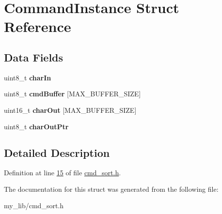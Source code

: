 \hypertarget{struct_command_instance}{\section{Command\-Instance Struct Reference}
\label{struct_command_instance}
}
\subsection*{Data Fields}
\begin{DoxyCompactItemize}
\item 
\hypertarget{struct_command_instance_a34f2e2824ae663982ef5d8a9ae4dbd76}{uint8\-\_\-t {\bfseries char\-In}}\label{struct_command_instance_a34f2e2824ae663982ef5d8a9ae4dbd76}

\item 
\hypertarget{struct_command_instance_a8b8b51e6eacf265b2fb0c83dc8fc8823}{uint8\-\_\-t {\bfseries cmd\-Buffer} \mbox{[}M\-A\-X\-\_\-\-B\-U\-F\-F\-E\-R\-\_\-\-S\-I\-Z\-E\mbox{]}}\label{struct_command_instance_a8b8b51e6eacf265b2fb0c83dc8fc8823}

\item 
\hypertarget{struct_command_instance_af1524bd8db77ca27b543a3c2a1a5638f}{uint16\-\_\-t {\bfseries char\-Out} \mbox{[}M\-A\-X\-\_\-\-B\-U\-F\-F\-E\-R\-\_\-\-S\-I\-Z\-E\mbox{]}}\label{struct_command_instance_af1524bd8db77ca27b543a3c2a1a5638f}

\item 
\hypertarget{struct_command_instance_a4817d15d26b34d5b4ae000d12e4d73ac}{uint8\-\_\-t {\bfseries char\-Out\-Ptr}}\label{struct_command_instance_a4817d15d26b34d5b4ae000d12e4d73ac}

\end{DoxyCompactItemize}


\subsection{Detailed Description}


Definition at line \hyperlink{cmd__sort_8h_source_l00015}{15} of file \hyperlink{cmd__sort_8h_source}{cmd\-\_\-sort.\-h}.



The documentation for this struct was generated from the following file\-:\begin{DoxyCompactItemize}
\item 
my\-\_\-lib/cmd\-\_\-sort.\-h\end{DoxyCompactItemize}
